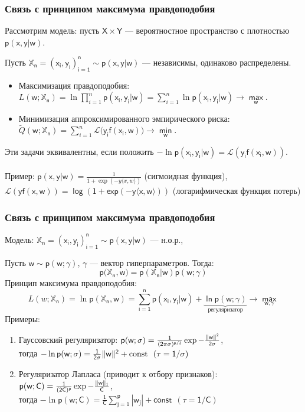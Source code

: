 \documentclass[unicode, notheorems]{beamer}
\begin{document}
\begin{frame}
	\frametitle{Связь с принципом максимума правдоподобия}
	Рассмотрим \alert{модель}: пусть $\mathsf{X\times Y}$ --- вероятностное пространство с плотностью $\mathsf{p(x,y|w)}$.
	
	Пусть $\mathbb{X}_\mathsf{n}=\mathsf{(x_i,y_i)_{i=1}^n \sim p(x,y|w)}$ --- независимы, одинаково распределены. 
	\begin{itemize}
		\item {\alert{Максимизация правдоподобия:}\\
		$L(\mathsf{w};\mathbb{X}_\mathsf{n})=\ln\prod\limits_{i=1}^n \mathsf{p(x_i,y_i|w)}=\sum\limits_{i=1}^n \ln \mathsf{p(x_i,y_i|w) \to \max\limits_w}$.}
		
		\item {\alert{Минимизация аппроксимированного эмпирического риска:}\\
			$\tilde{Q}(\mathsf{w};\mathbb{X}_\mathsf{n})=\sum\limits_{i=1}^n \mathcal{L}(\mathsf{y_if(x_i,w)) \to \min\limits_w}$.}
		
	\end{itemize}
Эти задачи эквивалентны, если положить $-\ln \mathsf{p(x_i,y_i|w)} = \mathcal{L}(\mathsf{y_if(x_i,w)})$. \\
~~\\
\alert{Пример:}
$\mathsf{p(x,y|w)}=\frac{1}{1+\exp(- y\langle x,w \rangle )}$ (сигмоидная функция), ~ $\mathsf{\mathcal{L}(yf(x,w))=\log (1+exp(-y\langle x,w \rangle))}$ (логарифмическая функция потерь)
\end{frame}

\begin{frame}
	\frametitle{Связь с принципом максимума правдоподобия}
	\alert{Модель}: $\mathbb{X}_\mathsf{n}=\mathsf{(x_i,y_i)_{i=1}^n \sim p(x,y|w)}$ --- н.о.р.,
	
	Пусть $\mathsf{w\sim p(w;\gamma)}$, $\mathsf{\gamma}$ --- вектор гиперпараметров. Тогда: 
	\begin{equation*}
	\mathsf{p}(\mathbb{X}_\mathsf{n},\mathsf{w)=p(\mathbb{X}_n|w)p(w;\gamma)}
	\end{equation*}
	Принцип максимума правдоподобия:
		\begin{equation*}
    L(w;\mathbb{X}_\mathsf{n})=\ln \mathsf{p(\mathbb{X}_n,w)=\sum\limits_{i=1}^n p(x_i,y_i|w)+\underbrace{\ln p(w;\gamma)}_{\text{регуляризатор}} \to \max\limits_{w,\gamma}}
	\end{equation*}
\alert{Примеры:} \begin{enumerate}
	\item {\alert{Гауссовский регуляризатор}: $\mathsf{p(w;\sigma)=\frac{1}{(2\pi\sigma)^{p/2}}\exp{-\frac{\Arrowvert w \Arrowvert ^2}{2\sigma}}}$,\\
		тогда $-\ln \mathsf{p(w;\sigma)=\frac{1}{2\sigma}\Arrowvert w \Arrowvert ^2+\text{const}~~(\tau=1/\sigma)}$}
	\item {\alert{Регуляризатор Лапласа} (приводит к отбору признаков): $\mathsf{p(w;C)=\frac{1}{(2C)^{p}}\exp{-\frac{\Arrowvert w \Arrowvert _1}{C}}}$,\\
		тогда $-\ln \mathsf{p(w;C)=\frac{1}{C}\sum\limits_{j=1}^p|w_j|+\text{const}~~(\tau=1/C)}$}
\end{enumerate}
\end{frame}
\end{document}
